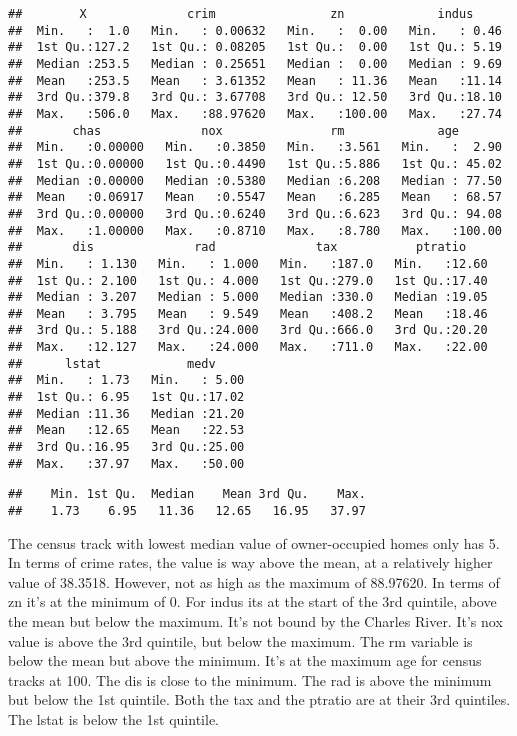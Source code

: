 \documentclass[
]{article}
\newenvironment{Shaded}{\begin{snugshade}}{\end{snugshade}}
\newcommand{\FunctionTok}[1]{\textcolor[rgb]{0.13,0.29,0.53}{\textbf{#1}}}
\newcommand{\NormalTok}[1]{#1}
\newcommand{\SpecialCharTok}[1]{\textcolor[rgb]{0.81,0.36,0.00}{\textbf{#1}}}
\begin{document}
\begin{verbatim}
##        X              crim                zn             indus      
##  Min.   :  1.0   Min.   : 0.00632   Min.   :  0.00   Min.   : 0.46  
##  1st Qu.:127.2   1st Qu.: 0.08205   1st Qu.:  0.00   1st Qu.: 5.19  
##  Median :253.5   Median : 0.25651   Median :  0.00   Median : 9.69  
##  Mean   :253.5   Mean   : 3.61352   Mean   : 11.36   Mean   :11.14  
##  3rd Qu.:379.8   3rd Qu.: 3.67708   3rd Qu.: 12.50   3rd Qu.:18.10  
##  Max.   :506.0   Max.   :88.97620   Max.   :100.00   Max.   :27.74  
##       chas              nox               rm             age        
##  Min.   :0.00000   Min.   :0.3850   Min.   :3.561   Min.   :  2.90  
##  1st Qu.:0.00000   1st Qu.:0.4490   1st Qu.:5.886   1st Qu.: 45.02  
##  Median :0.00000   Median :0.5380   Median :6.208   Median : 77.50  
##  Mean   :0.06917   Mean   :0.5547   Mean   :6.285   Mean   : 68.57  
##  3rd Qu.:0.00000   3rd Qu.:0.6240   3rd Qu.:6.623   3rd Qu.: 94.08  
##  Max.   :1.00000   Max.   :0.8710   Max.   :8.780   Max.   :100.00  
##       dis              rad              tax           ptratio     
##  Min.   : 1.130   Min.   : 1.000   Min.   :187.0   Min.   :12.60  
##  1st Qu.: 2.100   1st Qu.: 4.000   1st Qu.:279.0   1st Qu.:17.40  
##  Median : 3.207   Median : 5.000   Median :330.0   Median :19.05  
##  Mean   : 3.795   Mean   : 9.549   Mean   :408.2   Mean   :18.46  
##  3rd Qu.: 5.188   3rd Qu.:24.000   3rd Qu.:666.0   3rd Qu.:20.20  
##  Max.   :12.127   Max.   :24.000   Max.   :711.0   Max.   :22.00  
##      lstat            medv      
##  Min.   : 1.73   Min.   : 5.00  
##  1st Qu.: 6.95   1st Qu.:17.02  
##  Median :11.36   Median :21.20  
##  Mean   :12.65   Mean   :22.53  
##  3rd Qu.:16.95   3rd Qu.:25.00  
##  Max.   :37.97   Max.   :50.00
\end{verbatim}

\begin{Shaded}
\end{Shaded}

\begin{verbatim}
##    Min. 1st Qu.  Median    Mean 3rd Qu.    Max. 
##    1.73    6.95   11.36   12.65   16.95   37.97
\end{verbatim}

The census track with lowest median value of owner-occupied homes only
has 5. In terms of crime rates, the value is way above the mean, at a
relatively higher value of 38.3518. However, not as high as the maximum
of 88.97620. In terms of zn it's at the minimum of 0. For indus its at
the start of the 3rd quintile, above the mean but below the maximum.
It's not bound by the Charles River. It's nox value is above the 3rd
quintile, but below the maximum. The rm variable is below the mean but
above the minimum. It's at the maximum age for census tracks at 100. The
dis is close to the minimum. The rad is above the minimum but below the
1st quintile. Both the tax and the ptratio are at their 3rd quintiles.
The lstat is below the 1st quintile.
\end{document}
